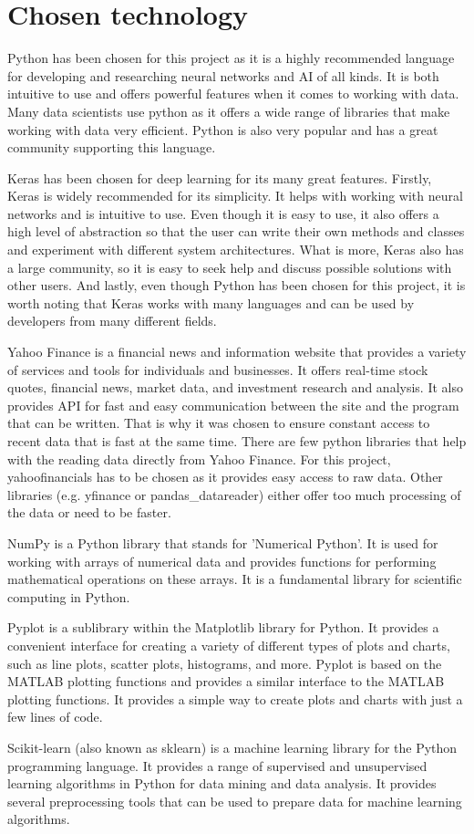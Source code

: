\section*{Chosen technology}
Python has been chosen for this project as it is a highly recommended language for developing and researching neural networks and AI of all kinds. It is both intuitive to use and offers powerful features when it comes to working with data. Many data scientists use python as it offers a wide range of libraries that make working with data very efficient. Python is also very popular and has a great community supporting this language.
\par
Keras has been chosen for deep learning for its many great features. Firstly, Keras is widely recommended for its simplicity. It helps with working with neural networks and is intuitive to use.
Even though it is easy to use, it also offers a high level of abstraction so that the user can write their own methods and classes and experiment with different system architectures.
What is more, Keras also has a large community, so it is easy to seek help and discuss possible solutions with other users.
And lastly, even though Python has been chosen for this project, it is worth noting that Keras works with many languages and can be used by developers from many different fields.
\par
Yahoo Finance is a financial news and information website that provides a variety of services and tools for individuals and businesses. It offers real-time stock quotes, financial news, market data, and investment research and analysis. It also provides API for fast and easy communication between the site and the program that can be written. That is why it was chosen to ensure constant access to recent data that is fast at the same time.
There are few python libraries that help with the reading data directly from Yahoo Finance. For this project, yahoofinancials has to be chosen as it provides easy access to raw data. Other libraries (e.g. yfinance or pandas{\_}datareader) either offer too much processing of the data or need to be faster.
\par
NumPy is a Python library that stands for 'Numerical Python'. It is used for working with arrays of numerical data and provides functions for performing mathematical operations on these arrays. It is a fundamental library for scientific computing in Python.
\par
Pyplot is a sublibrary within the Matplotlib library for Python. It provides a convenient interface for creating a variety of different types of plots and charts, such as line plots, scatter plots, histograms, and more. Pyplot is based on the MATLAB plotting functions and provides a similar interface to the MATLAB plotting functions. It provides a simple way to create plots and charts with just a few lines of code.
\par
Scikit-learn (also known as sklearn) is a machine learning library for the Python programming language. It provides a range of supervised and unsupervised learning algorithms in Python for data mining and data analysis. It provides several preprocessing tools that can be used to prepare data for machine learning algorithms.

